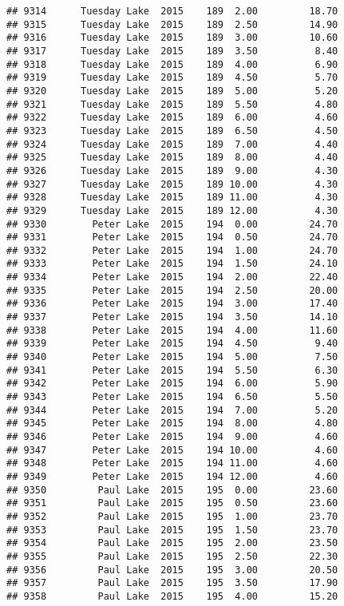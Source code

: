 \documentclass[
]{article}
\begin{document}
\begin{verbatim}
## 9314      Tuesday Lake  2015    189  2.00         18.70
## 9315      Tuesday Lake  2015    189  2.50         14.90
## 9316      Tuesday Lake  2015    189  3.00         10.60
## 9317      Tuesday Lake  2015    189  3.50          8.40
## 9318      Tuesday Lake  2015    189  4.00          6.90
## 9319      Tuesday Lake  2015    189  4.50          5.70
## 9320      Tuesday Lake  2015    189  5.00          5.20
## 9321      Tuesday Lake  2015    189  5.50          4.80
## 9322      Tuesday Lake  2015    189  6.00          4.60
## 9323      Tuesday Lake  2015    189  6.50          4.50
## 9324      Tuesday Lake  2015    189  7.00          4.40
## 9325      Tuesday Lake  2015    189  8.00          4.40
## 9326      Tuesday Lake  2015    189  9.00          4.30
## 9327      Tuesday Lake  2015    189 10.00          4.30
## 9328      Tuesday Lake  2015    189 11.00          4.30
## 9329      Tuesday Lake  2015    189 12.00          4.30
## 9330        Peter Lake  2015    194  0.00         24.70
## 9331        Peter Lake  2015    194  0.50         24.70
## 9332        Peter Lake  2015    194  1.00         24.70
## 9333        Peter Lake  2015    194  1.50         24.10
## 9334        Peter Lake  2015    194  2.00         22.40
## 9335        Peter Lake  2015    194  2.50         20.00
## 9336        Peter Lake  2015    194  3.00         17.40
## 9337        Peter Lake  2015    194  3.50         14.10
## 9338        Peter Lake  2015    194  4.00         11.60
## 9339        Peter Lake  2015    194  4.50          9.40
## 9340        Peter Lake  2015    194  5.00          7.50
## 9341        Peter Lake  2015    194  5.50          6.30
## 9342        Peter Lake  2015    194  6.00          5.90
## 9343        Peter Lake  2015    194  6.50          5.50
## 9344        Peter Lake  2015    194  7.00          5.20
## 9345        Peter Lake  2015    194  8.00          4.80
## 9346        Peter Lake  2015    194  9.00          4.60
## 9347        Peter Lake  2015    194 10.00          4.60
## 9348        Peter Lake  2015    194 11.00          4.60
## 9349        Peter Lake  2015    194 12.00          4.60
## 9350         Paul Lake  2015    195  0.00         23.60
## 9351         Paul Lake  2015    195  0.50         23.60
## 9352         Paul Lake  2015    195  1.00         23.70
## 9353         Paul Lake  2015    195  1.50         23.70
## 9354         Paul Lake  2015    195  2.00         23.50
## 9355         Paul Lake  2015    195  2.50         22.30
## 9356         Paul Lake  2015    195  3.00         20.50
## 9357         Paul Lake  2015    195  3.50         17.90
## 9358         Paul Lake  2015    195  4.00         15.20

\end{verbatim}
\end{document}
